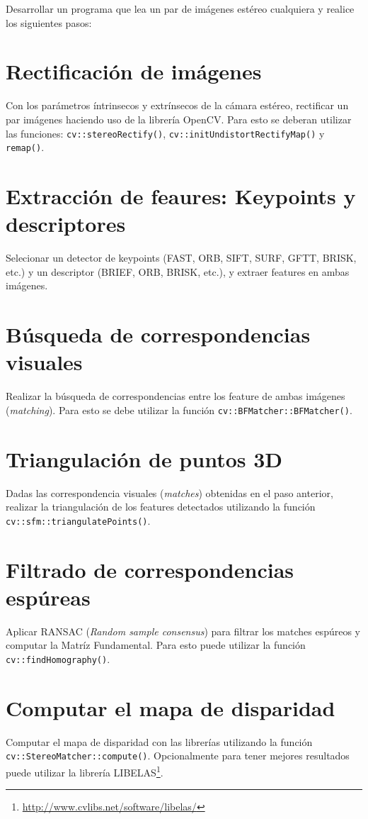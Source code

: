 \documentclass[tp]{lcc}
\begin{document}
Desarrollar un programa que lea un par de imágenes estéreo cualquiera y realice los siguientes pasos:

\section{Rectificación de imágenes}
Con los parámetros íntrinsecos y extrínsecos de la cámara estéreo, rectificar un par imágenes haciendo uso de la librería OpenCV. Para esto se deberan utilizar las funciones:  \lstinline{cv::stereoRectify()},  \lstinline{cv::initUndistortRectifyMap()} y  \lstinline{remap()}.

\section{Extracción de feaures: Keypoints y descriptores}
Selecionar un detector de keypoints (FAST, ORB, SIFT, SURF, GFTT, BRISK, etc.) y un descriptor (BRIEF, ORB, BRISK, etc.), y extraer features en ambas imágenes.

\section{Búsqueda de correspondencias visuales}
Realizar la búsqueda de correspondencias entre los feature de ambas imágenes (\emph{matching}). Para esto se debe utilizar la función \lstinline{cv::BFMatcher::BFMatcher()}. 

\section{Triangulación de puntos 3D}
Dadas las correspondencia visuales (\emph{matches}) obtenidas en el paso anterior, realizar la triangulación de los features detectados utilizando la función \lstinline{cv::sfm::triangulatePoints()}.

\section{Filtrado de correspondencias espúreas}
Aplicar RANSAC (\emph{Random sample consensus}) para filtrar los matches espúreos y computar la Matríz Fundamental. Para esto puede utilizar la función \lstinline{cv::findHomography()}.

\section{Computar el mapa de disparidad}
Computar el mapa de disparidad con las librerías utilizando la función \lstinline{cv::StereoMatcher::compute()}. Opcionalmente para tener mejores resultados puede utilizar la librería LIBELAS\footnote{\url{http://www.cvlibs.net/software/libelas/}}.
\end{document}
